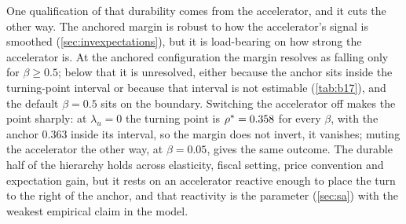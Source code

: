 One qualification of that durability comes from the accelerator, and it cuts the
other way. The anchored margin is robust to how the accelerator's signal is
smoothed (\cref{sec:invexpectations}), but it is load-bearing on how strong the
accelerator is. At the anchored configuration the margin resolves as falling
only for $\beta \ge 0.5$; below that it is unresolved, either because the anchor
sits inside the turning-point interval or because that interval is not estimable
(\cref{tab:b17}), and the default $\beta = 0.5$ sits on the boundary. Switching
the accelerator off makes the point sharply: at $\lambda_u = 0$ the turning
point is $\rho^{\ast} = 0.358$ for every $\beta$, with the anchor $0.363$ inside its
interval, so the margin does not invert, it vanishes; muting the accelerator the
other way, at $\beta = 0.05$, gives the same outcome. The durable half of the
hierarchy holds across elasticity, fiscal setting, price convention and
expectation gain, but it rests on an accelerator reactive enough to place the
turn to the right of the anchor, and that reactivity is the parameter
(\cref{sec:sa}) with the weakest empirical claim in the model.
